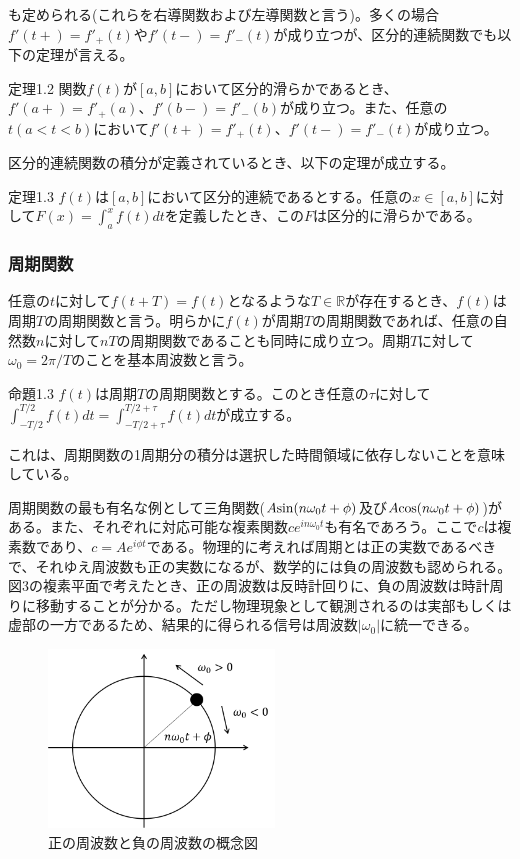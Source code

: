 \documentclass[dvipdfmx, 9pt, a4paper]{jsarticle}
\begin{document}
も定められる(これらを右導関数および左導関数と言う)。多くの場合$f'(t+)=f'_+(t)$や$f'(t-)=f'_-(t)$が成り立つが、区分的連続関数でも以下の定理が言える。
\begin{itembox}[l]{定理1.2}
関数$f(t)$が$[a,b]$において区分的滑らかであるとき、$f'(a+)=f'_+(a)$、$f'(b-)=f'_-(b)$が成り立つ。また、任意の$t(a<t<b)$において$f'(t+)=f'_+(t)$、$f'(t-)=f'_-(t)$が成り立つ。
\end{itembox}\par
区分的連続関数の積分が定義されているとき、以下の定理が成立する。
\begin{itembox}[l]{定理1.3}
$f(t)$は$[a,b]$において区分的連続であるとする。任意の$x \in [a,b]$に対して$F(x)=\int_a^xf(t)dt$を定義したとき、この$F$は区分的に滑らかである。
\end{itembox}

\subsubsection{周期関数}
任意の$t$に対して$f(t+T)=f(t)$となるような$T \in \mathbb{R}$が存在するとき、$f(t)$は周期$T$の周期関数と言う。明らかに$f(t)$が周期$T$の周期関数であれば、任意の自然数$n$に対して$nT$の周期関数であることも同時に成り立つ。周期$T$に対して$\omega_0=2\pi/T$のことを基本周波数と言う。
\begin{itembox}[l]{命題1.3}
$f(t)$は周期$T$の周期関数とする。このとき任意の$\tau$に対して$\int_{-T/2}^{T/2}f(t)dt=\int_{-T/2+\tau}^{T/2+\tau}f(t)dt$が成立する。
\end{itembox}\par
これは、周期関数の1周期分の積分は選択した時間領域に依存しないことを意味している。\par
周期関数の最も有名な例として三角関数($A{\rm sin}(n\omega_0t+\phi)$及び$A{\rm cos}(n\omega_0t+\phi)$)がある。また、それぞれに対応可能な複素関数$ce^{in\omega_0t}$も有名であろう。ここで$c$は複素数であり、$c=Ae^{i\phi t}$である。物理的に考えれば周期とは正の実数であるべきで、それゆえ周波数も正の実数になるが、数学的には負の周波数も認められる。図3の複素平面で考えたとき、正の周波数は反時計回りに、負の周波数は時計周りに移動することが分かる。ただし物理現象として観測されるのは実部もしくは虚部の一方であるため、結果的に得られる信号は周波数$|\omega_0|$に統一できる。

\begin{figure}[b]
\begin{center}
\includegraphics[width=6cm]{fig3.png}
\caption{正の周波数と負の周波数の概念図}
\end{center}
\end{figure}
\end{document}
